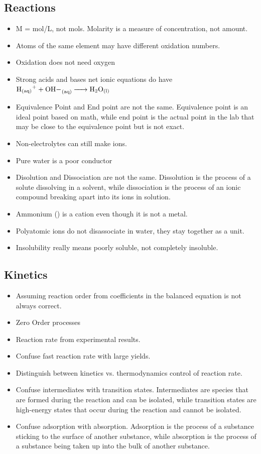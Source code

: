     \subsection{Reactions}
    \begin{itemize}
        \item M = mol/L, not mols. Molarity is a measure of concentration, not amount.
        \item Atoms of the same element may have different oxidation numbers. 
        \item Oxidation does not need oxygen
        \item Strong acids and bases net ionic equations do have $\ce{H+_{(aq)} + OH-_{(aq)} -> H2O_{(l)}}$
        \item Equivalence Point and End point are not the same. Equivalence point is an ideal point based on math, while end point is the actual point in the lab that may be close to the equivalence point but is not exact.
        \item Non-electrolytes can still make ions.
        \item Pure water is a poor conductor
        \item Disolution and Dissociation are not the same. Dissolution is the process of a solute dissolving in a solvent, while dissociation is the process of an ionic compound breaking apart into its ions in solution.
        \item Ammonium () is a cation even though it is not a metal.
        \item Polyatomic ions do not disassociate in water, they stay together as a unit.
        \item Insolubility really means poorly soluble, not completely insoluble.
    \end{itemize}
    \subsection{Kinetics}
        \begin{itemize}
            \item Assuming reaction order from coefficients in the balanced equation is not always correct. 
            \item Zero Order processes
            \item Reaction rate from experimental results.
            \item Confuse fast reaction rate with large yields.
            \item Distinguish between kinetics vs. thermodynamics control of reaction rate. 
            \item Confuse intermediates with transition states. Intermediates are species that are formed during the reaction and can be isolated, while transition states are high-energy states that occur during the reaction and cannot be isolated.
            \item Confuse adsorption with absorption. Adsorption is the process of a substance sticking to the surface of another substance, while absorption is the process of a substance being taken up into the bulk of another substance.
        \end{itemize}
